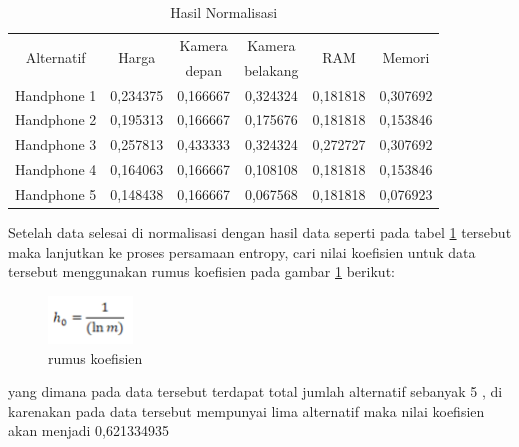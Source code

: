 \begin{table}[h]
\caption{Hasil Normalisasi}
\centering
\begin{tabular}{|c|c|c|c|c|c|}
\hline
\multirow{2}{*}{Alternatif} &\multirow{2}{*}{ Harga}& Kamera & Kamera&\multirow{2}{*}{RAM}& \multirow{2}{*}{Memori}\\
& & depan & belakang & &\\
\hline
Handphone 1 &0,234375& 0,166667 & 0,324324 & 0,181818 & 0,307692\\
\hline
Handphone 2 & 0,195313 & 0,166667 & 0,175676 & 0,181818 & 0,153846\\
\hline
Handphone 3 & 0,257813 & 0,433333& 0,324324 & 0,272727 & 0,307692\\
\hline
Handphone 4 & 0,164063 & 0,166667& 0,108108 & 0,181818 & 0,153846\\
\hline
Handphone 5 & 0,148438 & 0,166667& 0,067568 & 0,181818 & 0,076923\\
\hline
\end{tabular}
\label{TA4}
\end{table}

Setelah data selesai di normalisasi dengan hasil data seperti pada tabel \ref{TA4} tersebut maka lanjutkan ke proses persamaan entropy, cari nilai koefisien untuk data tersebut menggunakan rumus koefisien pada gambar \ref{rmm1} berikut:

\begin{figure}[h]
	\centerline{\includegraphics[width=0.2\textwidth]{figures/rumus/5.png}}
	\caption{rumus koefisien}
	\label{rmm1}
\end{figure}

yang dimana pada data tersebut terdapat total jumlah alternatif sebanyak 5 , di karenakan pada data tersebut mempunyai lima alternatif maka nilai koefisien akan menjadi 0,621334935 \par

